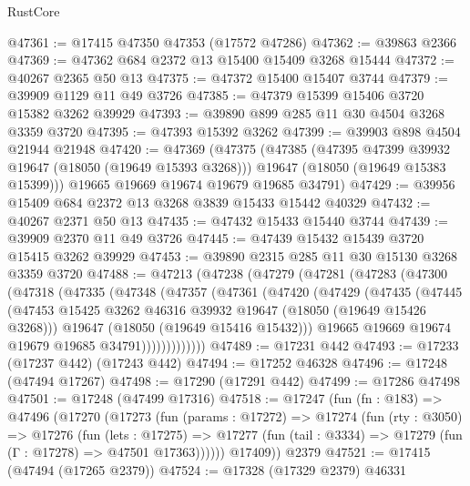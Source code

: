 \begin{lexlean}{RustCore}
\begin{coremodule}
@47361 := @17415 @47350 @47353 (@17572 @47286)
@47362 := @39863 @2366
@47369 := @47362 @684 @2372 @13 @15400 @15409 @3268 @15444
@47372 := @40267 @2365 @50 @13
@47375 := @47372 @15400 @15407 @3744
@47379 := @39909 @1129 @11 @49 @3726
@47385 := @47379 @15399 @15406 @3720 @15382 @3262 @39929
@47393 := @39890 @899 @285 @11 @30 @4504 @3268 @3359 @3720
@47395 := @47393 @15392 @3262
@47399 := @39903 @898 @4504 @21944 @21948
@47420 := @47369
    (@47375
      (@47385
        (@47395 @47399 @39932 @19647 (@18050 (@19649 @15393 @3268)))
        @19647
        (@18050 (@19649 @15383 @15399)))
      @19665
      @19669
      @19674
      @19679
      @19685
      @34791)
@47429 := @39956 @15409 @684 @2372 @13 @3268 @3839 @15433 @15442 @40329
@47432 := @40267 @2371 @50 @13
@47435 := @47432 @15433 @15440 @3744
@47439 := @39909 @2370 @11 @49 @3726
@47445 := @47439 @15432 @15439 @3720 @15415 @3262 @39929
@47453 := @39890 @2315 @285 @11 @30 @15130 @3268 @3359 @3720
@47488 := @47213
    (@47238
      (@47279
        (@47281
          (@47283
            (@47300
              (@47318
                (@47335
                  (@47348
                    (@47357
                      (@47361
                        (@47420
                          (@47429
                            (@47435
                              (@47445
                                (@47453
                                  @15425
                                  @3262
                                  @46316
                                  @39932
                                  @19647
                                  (@18050 (@19649 @15426 @3268)))
                                @19647
                                (@18050 (@19649 @15416 @15432)))
                              @19665
                              @19669
                              @19674
                              @19679
                              @19685
                              @34791)))))))))))))
@47489 := @17231 @442
@47493 := @17233 (@17237 @442) (@17243 @442)
@47494 := @17252 @46328
@47496 := @17248 (@47494 @17267)
@47498 := @17290 (@17291 @442)
@47499 := @17286 @47498
@47501 := @17248 (@47499 @17316)
@47518 := @17247
    (fun (fn : @183) =>
    @47496
      (@17270
        (@17273
          (fun (params : @17272) =>
          @17274
            (fun (rty : @3050) =>
            @17276
              (fun (lets : @17275) =>
              @17277 (fun (tail : @3334) => @17279 (fun (Γ : @17278) => @47501 @17363))))))
        @17409))
    @2379
@47521 := @17415 (@47494 (@17265 @2379))
@47524 := @17328 (@17329 @2379) @46331

\end{coremodule}
\end{lexlean}
